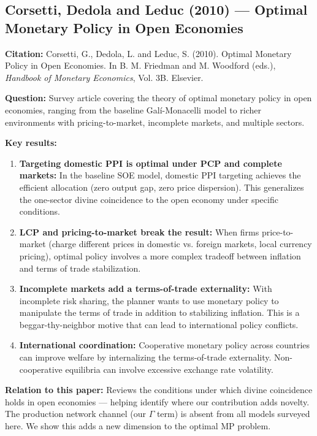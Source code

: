 \documentclass[12pt]{article}
\begin{document}
\subsection{Corsetti, Dedola and Leduc (2010) --- Optimal Monetary Policy in Open Economies}

\textbf{Citation:} Corsetti, G., Dedola, L. and Leduc, S. (2010). Optimal Monetary Policy in Open Economies. In B. M. Friedman and M. Woodford (eds.), \textit{Handbook of Monetary Economics}, Vol. 3B. Elsevier.

\textbf{Question:} Survey article covering the theory of optimal monetary policy in open economies, ranging from the baseline Galí-Monacelli model to richer environments with pricing-to-market, incomplete markets, and multiple sectors.

\textbf{Key results:}
\begin{enumerate}
    \item \textbf{Targeting domestic PPI is optimal under PCP and complete markets:} In the baseline SOE model, domestic PPI targeting achieves the efficient allocation (zero output gap, zero price dispersion). This generalizes the one-sector divine coincidence to the open economy under specific conditions.
    \item \textbf{LCP and pricing-to-market break the result:} When firms price-to-market (charge different prices in domestic vs. foreign markets, local currency pricing), optimal policy involves a more complex tradeoff between inflation and terms of trade stabilization.
    \item \textbf{Incomplete markets add a terms-of-trade externality:} With incomplete risk sharing, the planner wants to use monetary policy to manipulate the terms of trade in addition to stabilizing inflation. This is a beggar-thy-neighbor motive that can lead to international policy conflicts.
    \item \textbf{International coordination:} Cooperative monetary policy across countries can improve welfare by internalizing the terms-of-trade externality. Non-cooperative equilibria can involve excessive exchange rate volatility.
\end{enumerate}

\textbf{Relation to this paper:} Reviews the conditions under which divine coincidence holds in open economies --- helping identify where our contribution adds novelty. The production network channel (our $\Gamma$ term) is absent from all models surveyed here. We show this adds a new dimension to the optimal MP problem.
\end{document}
